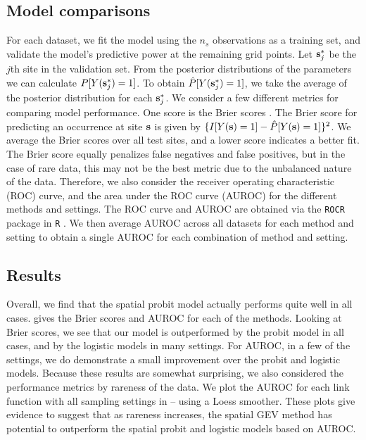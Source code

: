 \subsection{Model comparisons}\label{rbs:cv}

For each dataset, we fit the model using the $n_s$ observations as a training set, and validate the model's predictive power at the remaining grid points.
Let $\mathbf{s}^*_j$ be the $j$th site in the validation set.
From the posterior distributions of the parameters we can calculate $P[Y(\mathbf{s}^*_j) = 1]$.
To obtain $\hat{P}[Y(\mathbf{s}^*_j) = 1]$, we take the average of the posterior distribution for each $\mathbf{s}^*_j$.
We consider a few different metrics for comparing model performance.
One score is the Brier scores \citep[BS]{Gneiting2007}.
The Brier score for predicting an occurrence at site $\mathbf{s}$ is given by $\{I[Y(\mathbf{s})=1] - \hat{P}[Y(\mathbf{s})=1]\}^2$.
We average the Brier scores over all test sites, and a lower score indicates a better fit.
The Brier score equally penalizes false negatives and false positives, but in the case of rare data, this may not be the best metric due to the unbalanced nature of the data.
Therefore, we also consider the receiver operating characteristic (ROC) curve, and the area under the ROC curve (AUROC) for the different methods and settings.
The ROC curve and AUROC are obtained via the \texttt{ROCR} \citep{Sing2005} package in \texttt{R} \citep{Rmanual}.
We then average AUROC across all datasets for each method and setting to obtain a single AUROC for each combination of method and setting.

\subsection{Results} \label{rbs:simresults}

Overall, we find that the spatial probit model actually performs quite well in all cases.
 gives the Brier scores and AUROC for each of the methods.
Looking at Brier scores, we see that our model is outperformed by the probit model in all cases, and by the logistic models in many settings.
For AUROC, in a few of the settings, we do demonstrate a small improvement over the probit and logistic models.
Because these results are somewhat surprising, we also considered the performance metrics by rareness of the data.
We plot the AUROC for each link function with all sampling settings in  --  using a Loess smoother.
These plots give evidence to suggest that as rareness increases, the spatial GEV method has potential to outperform the spatial probit and logistic models based on AUROC.

